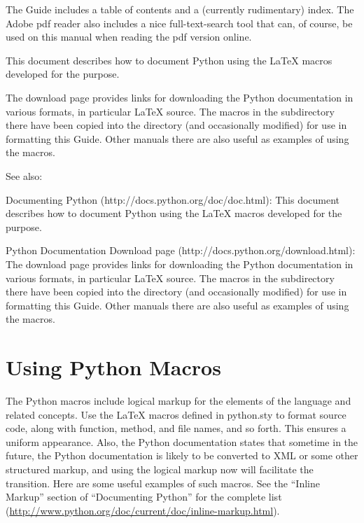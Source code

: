 The Guide includes a table of contents and a (currently rudimentary) index.
The Adobe  pdf reader also includes a nice full-text-search tool that can,
of course, be used on this manual when reading the pdf version online.

\begin{seealso}
 {This
  document describes how to document Python using the \LaTeX{} macros
  developed for the purpose.}

 {The download page provides links for downloading the
  Python documentation in various formats, in particular \LaTeX{} source.
  The macros in the  subdirectory there have been copied
  into the  directory (and occasionally modified) for use
  in formatting this Guide.  Other manuals there are also useful as
  examples of using the macros.}
\end{seealso}
\begin{htmlonly}
See also:

Documenting Python (http://docs.python.org/doc/doc.html): This document
describes how to document Python using the \LaTeX{} macros
developed for the purpose.

Python Documentation Download page (http://docs.python.org/download.html):
The download page provides links for downloading the Python documentation
in various formats, in particular \LaTeX{} source.  The macros in the
 subdirectory there have been copied into the
 directory (and occasionally modified) for use in
formatting this Guide.  Other manuals there are also useful as examples
of using the macros.
\end{htmlonly}

\section{Using Python Macros}

The Python macros include logical markup for the elements of the language
and related concepts.  Use the \LaTeX{} macros defined in python.sty to
format source code, along with function, method, and file names, and so
forth.  This ensures a uniform appearance.  Also, the Python documentation
states that sometime in the future, the Python documentation is likely to
be converted to XML or some other structured markup, and using the logical
markup now will facilitate the transition.  Here are some useful examples
of such macros.  See the ``Inline Markup'' section of ``Documenting Python''
for the complete list
(\url{http://www.python.org/doc/current/doc/inline-markup.html}).


